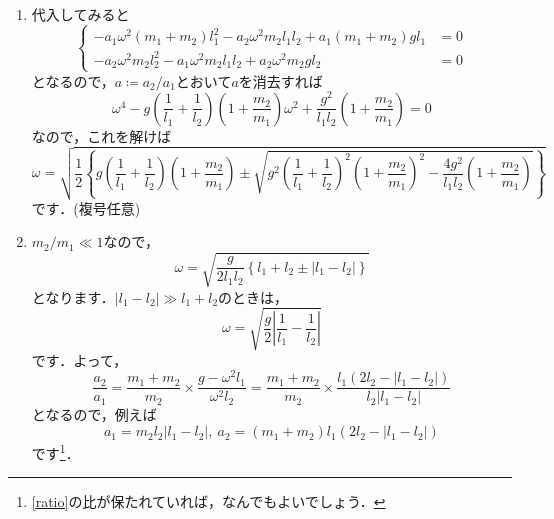 \documentclass[a4paper,pdflatex,ja=standard]{bxjsarticle}
\begin{document}
\begin{enumerate}
  \item 
  代入してみると
  \begin{equation}
    \left\{
      \begin{alignedat}{1}
        -
        a_1\omega^2
        (m_1+m_2)
        l_1^2
        -
        a_2
        \omega^2
        m_2l_1l_2
        +
        a_1(m_1+m_2)gl_1
        &=
        0
        \\
        -a_2\omega^2
        m_2l_2^2
        -
        a_1\omega^2
        m_2l_1l_2
        +
        a_2\omega^2m_2gl_2
        &=
        0
      \end{alignedat}
    \right.
  \end{equation}
  となるので，$a\coloneqq a_2/a_1$とおいて$a$を消去すれば
  \begin{equation}
    \omega^4
    -
    g
    \left(  
      \frac{1}{l_1}+\frac{1}{l_2}
    \right)
    \left(  
      1+\frac{m_2}{m_1}
    \right)
    \omega^2
    +
    \frac{g^2}{l_1l_2}
    \left(  
      1+\frac{m_2}{m_1}
    \right)
    =
    0
  \end{equation}
  なので，これを解けば
  \begin{equation}
    \omega
    =
    \sqrt{
      \frac{1}{2}
      \left\{  
        g
        \left(  
          \frac{1}{l_1}+\frac{1}{l_2}
        \right)
        \left(  
          1+\frac{m_2}{m_1}
        \right)
        \pm
        \sqrt{
          g^2
          \left(  
            \frac{1}{l_1}+\frac{1}{l_2}
          \right)^2
          \left( 1+\frac{m_2}{m_1} \right)^2
          -
          \frac{4g^2}{l_1l_2}
          \left( 1+\frac{m_2}{m_1} \right)
        }
      \right\}      
    }
  \end{equation}
  です．(複号任意)

  \item 
  $m_2/m_1\ll 1$なので，
  \begin{equation}
    \omega
    =
    \sqrt{
      \frac{g}{2l_1l_2}
      \left\{  
        l_1+l_2
        \pm
        |l_1-l_2|
      \right\}
    }
    \label{eigen_ang}
  \end{equation}
  となります．$|l_1-l_2|\gg l_1+l_2$のときは，
  \begin{equation}
    \omega
    =
    \sqrt{
      \frac{g}{2}
      \left|  
        \frac{1}{l_1}-\frac{1}{l_2}
      \right|
    }
  \end{equation}
  です．よって，
  \begin{equation}
    \frac{a_2}{a_1}
    =
    \frac{m_1+m_2}{m_2}
    \times
    \frac{g-\omega^2l_1}{\omega^2l_2}
    =
    \frac{m_1+m_2}{m_2}
    \times
    \frac{l_1(2l_2-|l_1-l_2|)}{l_2|l_1-l_2|}
    \label{ratio}
  \end{equation}
  となるので，例えば
  \begin{equation}
    a_1=m_2l_2|l_1-l_2|
    ,\ 
    a_2=(m_1+m_2)l_1(2l_2-|l_1-l_2|)
  \end{equation}
  です\footnote{
    \eqref{ratio}の比が保たれていれば，なんでもよいでしょう．
  }．


\end{enumerate}
\end{document}
